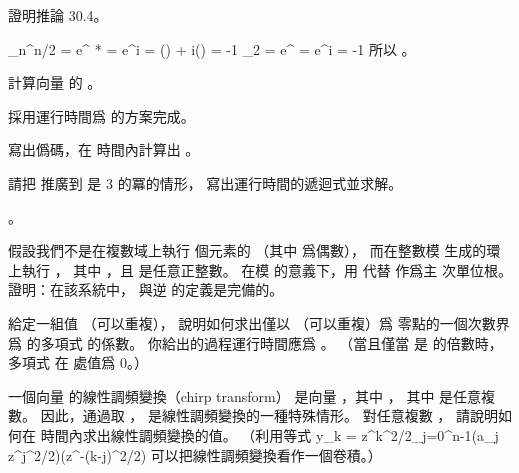 \startsection[
  title={The DFT and FFT},
  reference=section:dft_fft,
]

\startEXERCISE
證明推論 30.4。
\stopEXERCISE

\startANSWER
\startformula\startmathalignment
\NC \omega_n^{n/2} \NC = e^{ * }
    = e^{\pi i} = \cos(\pi) + i\sin(\pi) = -1 \NR
\NC \omega_2 \NC = e^{} = e^{\pi i} = -1 \NR
\stopmathalignment\stopformula
所以 。
\stopANSWER

\startEXERCISE
計算向量  的 。
\stopEXERCISE

\startANSWER
{}
\stopANSWER

\startEXERCISE
採用運行時間爲  的方案完成\inexercise[30.1-1]。
\stopEXERCISE

\startANSWER
{}
\stopANSWER

\startEXERCISE
寫出僞碼，在  時間內計算出 。
\stopEXERCISE

\startANSWER
{}
\stopANSWER

\startEXERCISE
請把  推廣到  是 3 的冪的情形，
寫出運行時間的遞迴式並求解。
\stopEXERCISE

\startANSWER
{}。
\stopANSWER

\startEXERCISE[exercise:30.2-6]\DIFFICULT
假設我們不是在複數域上執行  個元素的  （其中  爲偶數），
而在整數模  生成的環  上執行 ，
其中 ，且  是任意正整數。
在模  的意義下，用  代替  作爲主  次單位根。
證明：在該系統中，  與逆  的定義是完備的。
\stopEXERCISE

\startANSWER
{}
\stopANSWER

\startEXERCISE
給定一組值  （可以重複），
說明如何求出僅以  （可以重複）爲
零點的一個次數界爲  的多項式  的係數。
你給出的過程運行時間應爲 。
（\hint 當且僅當  是  的倍數時，
多項式  在  處值爲 0。）
\stopEXERCISE

\startANSWER
{}
\stopANSWER

\startEXERCISE\DIFFICULT
一個向量  的{\EMP 線性調頻變換}（chirp transform）
是向量 ，其中 ，
其中  是任意複數。
因此，通過取 ，  是線性調頻變換的一種特殊情形。
對任意複數 ，
請說明如何在  時間內求出線性調頻變換的值。
（\hint 利用等式
\startformula
y_k = z^{k^2/2}\sum_{j=0}^{n-1}(a_j z^{j^2/2})(z^{-(k-j)^2/2})
\stopformula
可以把線性調頻變換看作一個卷積。）
\stopEXERCISE

